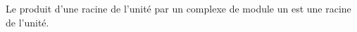 Le produit d'une racine de l'unité par un complexe de module un est une racine de l'unité.

\begin{reponses}
\end{reponses}

